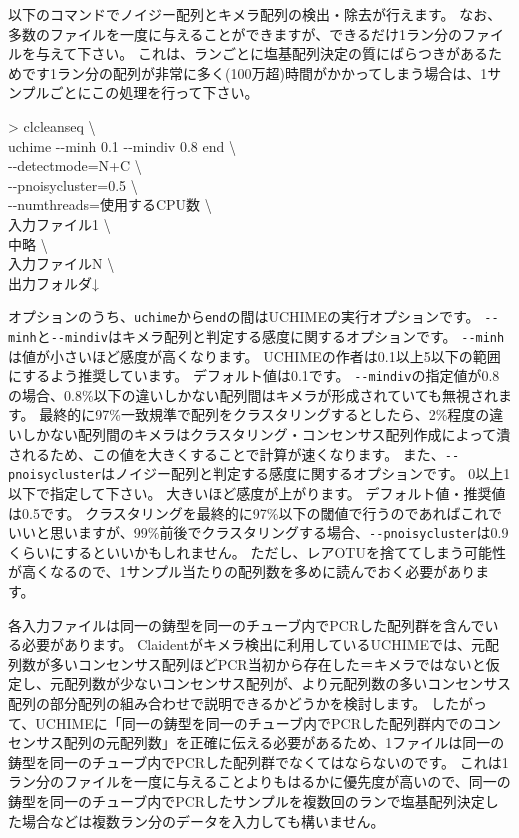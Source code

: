 \documentclass[titlepage,10pt,a4paper]{jsbook}
\newenvironment{cmd}{\begin{oframed}\raggedright\ttfamily\footnotesize\setlength{\baselineskip}{1.4em}}{\end{oframed}\vspace{-1em}}
\begin{document}
以下のコマンドでノイジー配列とキメラ配列の検出・除去が行えます。
なお、多数のファイルを一度に与えることができますが、できるだけ1ラン分のファイルを与えて下さい。
これは、ランごとに塩基配列決定の質にばらつきがあるためです1ラン分の配列が非常に多く(100万超)時間がかかってしまう場合は、1サンプルごとにこの処理を行って下さい。
\begin{cmd}
{\textgreater} clcleanseq {\textbackslash}\\
uchime {-}{-}minh 0.1 {-}{-}mindiv 0.8 end {\textbackslash}\\
{-}{-}detectmode=N+C {\textbackslash}\\
{-}{-}pnoisycluster=0.5 {\textbackslash}\\
{-}{-}numthreads=使用するCPU数 {\textbackslash}\\
入力ファイル1 {\textbackslash}\\
中略 {\textbackslash}\\
入力ファイルN {\textbackslash}\\
出力フォルダ↓
\end{cmd}
オプションのうち、\texttt{uchime}から\texttt{end}の間はUCHIMEの実行オプションです。
\texttt{{-}{-}minh}と\texttt{{-}{-}mindiv}はキメラ配列と判定する感度に関するオプションです。
\texttt{{-}{-}minh}は値が小さいほど感度が高くなります。
UCHIMEの作者は0.1以上5以下の範囲にするよう推奨しています。
デフォルト値は0.1です。
\texttt{{-}{-}mindiv}の指定値が0.8の場合、0.8\%以下の違いしかない配列間はキメラが形成されていても無視されます。
最終的に97\%一致規準で配列をクラスタリングするとしたら、2\%程度の違いしかない配列間のキメラはクラスタリング・コンセンサス配列作成によって潰されるため、この値を大きくすることで計算が速くなります。
また、\texttt{{-}{-}pnoisycluster}はノイジー配列と判定する感度に関するオプションです。
0以上1以下で指定して下さい。
大きいほど感度が上がります。
デフォルト値・推奨値は0.5です。
クラスタリングを最終的に97\%以下の閾値で行うのであればこれでいいと思いますが、99\%前後でクラスタリングする場合、\texttt{{-}{-}pnoisycluster}は0.9くらいにするといいかもしれません。
ただし、レアOTUを捨ててしまう可能性が高くなるので、1サンプル当たりの配列数を多めに読んでおく必要があります。

各入力ファイルは同一の鋳型を同一のチューブ内でPCRした配列群を含んでいる必要があります。
Claidentがキメラ検出に利用しているUCHIMEでは、元配列数が多いコンセンサス配列ほどPCR当初から存在した＝キメラではないと仮定し、元配列数が少ないコンセンサス配列が、より元配列数の多いコンセンサス配列の部分配列の組み合わせで説明できるかどうかを検討します。
したがって、UCHIMEに「同一の鋳型を同一のチューブ内でPCRした配列群内でのコンセンサス配列の元配列数」を正確に伝える必要があるため、1ファイルは同一の鋳型を同一のチューブ内でPCRした配列群でなくてはならないのです。
これは1ラン分のファイルを一度に与えることよりもはるかに優先度が高いので、同一の鋳型を同一のチューブ内でPCRしたサンプルを複数回のランで塩基配列決定した場合などは複数ラン分のデータを入力しても構いません。
\end{document}
